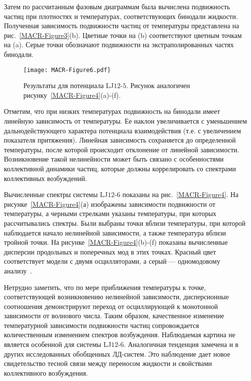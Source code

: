 Затем по рассчитанным фазовым диаграммам была вычислена подвижность частиц при плотностях и температурах, соответствующих бинодали жидкости.
Полученная зависимость подвижности частиц от температуры представлена на рис.~\ref{MACR-Figure3}(b).
Цветные точки на (b) соответствуют цветным точкам на (a).
Серые точки обозначают подвижности на экстраполированных частях бинодали.

\begin{figure}[!t]
\centering
    \texttt{[image: MACR-Figure6.pdf]}
    \caption{Результаты для потенциала LJ$12$-$5$.
    Рисунок аналогичен рисунку~\ref{MACR-Figure4}(a)-(f).}
\label{MACR-Figure6}
\end{figure}

Отметим, что при низких температурах подвижность на бинодали имеет линейную зависимость от температуры.
Ее наклон увеличивается с уменьшением дальнодействующего характера потенциала взаимодействия (т.е. с увеличением показателя притяжения).
Линейная зависимость сохраняется до определенной температуры, после которой происходит отклонение от линейной зависимости.
Возникновение такой нелинейности может быть связано с особенностями коллективной динамики частиц, которые должны коррелировать со спектрами коллективных возбуждений.

Вычисленные спектры системы LJ$12$-$6$ показаны на рис.~\ref{MACR-Figure4}.
На рисунке~\ref{MACR-Figure4}(а) изображены зависимости подвижности от температуры, а черными стрелками указаны температуры, при которых рассчитывались спектры. 
Были выбраны точки вблизи температуры, при которой наблюдается начало нелинейной зависимости, а также температура вблизи тройной точки.
На рисунке~\ref{MACR-Figure4}(b)-(f) показаны вычисленные дисперсии продольных и поперечных мод в этих точках.
Красный цвет соответствует модели с двумя осцилляторами, а серый — одномодовому анализу~\cite{10.1038/s41598-019-46979-y}.

Нетрудно заметить, что по мере приближения температуры к точке, соответствующей возникновению нелинейной зависимости, дисперсионные соотношения демонстрируют переход от осциллирующей к монотонной зависимости от волнового числа.
Таким образом, качественное изменение температурной зависимости подвижности частиц сопровождается количественным изменением спектров возбуждения.
Наблюдаемая картина не является особенной для системы LJ$12$-$6$.
Аналогичная тенденция замечена и в других исследованных обобщенных ЛД-систем.
Это наблюдение дает новое свидетельство тесной связи между переносом жидкости и свойствами коллективного возбуждения.


